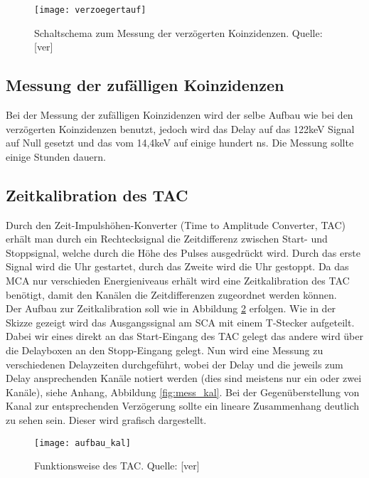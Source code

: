 \begin{figure}[h]
\begin{center}
\texttt{[image: verzoegertauf]}
\caption{Schaltschema zum Messung der verzögerten Koinzidenzen. Quelle: [ver]}
\label{fig:verzoegertauf}
\end{center}
\end{figure}

\subsection{Messung der zufälligen Koinzidenzen}
Bei der Messung der zufälligen Koinzidenzen wird der selbe Aufbau wie bei den verzögerten Koinzidenzen benutzt, jedoch wird das Delay auf das 122keV Signal auf Null gesetzt und das vom 14,4keV auf einige hundert ns. Die Messung sollte einige Stunden dauern.
\subsection{Zeitkalibration des TAC}
Durch den Zeit-Impulshöhen-Konverter (Time to Amplitude Converter, TAC) erhält man durch ein Rechtecksignal die Zeitdifferenz zwischen Start- und Stoppsignal, welche durch die Höhe des Pulses ausgedrückt wird. Durch das erste Signal wird die Uhr gestartet, durch das Zweite wird die Uhr gestoppt. Da das MCA nur verschieden Energieniveaus erhält wird eine Zeitkalibration des TAC benötigt, damit den Kanälen die Zeitdifferenzen zugeordnet werden können.\\

Der Aufbau zur Zeitkalibration soll wie in Abbildung \ref{fig:aufbau_kal} erfolgen. Wie in der Skizze gezeigt wird das Ausgangssignal am SCA mit einem T-Stecker aufgeteilt. Dabei wir eines direkt an das Start-Eingang des TAC gelegt das andere wird über die Delayboxen an den Stopp-Eingang gelegt. Nun wird eine Messung zu verschiedenen Delayzeiten durchgeführt, wobei der Delay und die jeweils zum Delay ansprechenden Kanäle notiert werden (dies sind meistens nur ein oder zwei Kanäle), siehe Anhang, Abbildung \ref{fig:mess_kal}. Bei der Gegenüberstellung von Kanal zur entsprechenden Verzögerung sollte ein lineare Zusammenhang deutlich zu sehen sein. Dieser wird grafisch dargestellt.\\
\begin{figure}[h]
\begin{center}
\texttt{[image: aufbau\_kal]}
\caption{Funktionsweise des TAC. Quelle: [ver]}
\label{fig:aufbau_kal}
\end{center}
\end{figure}\\